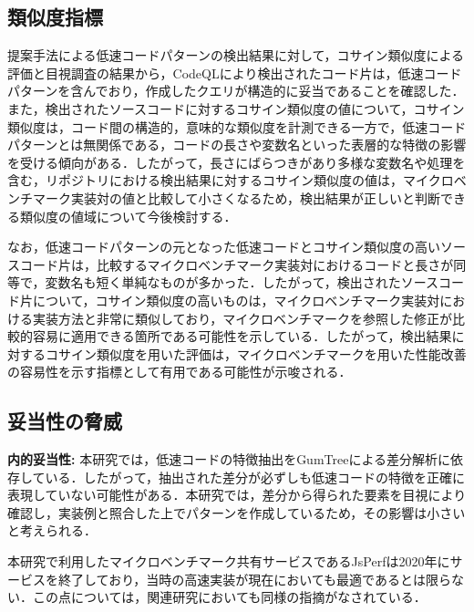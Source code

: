 \documentclass[submit,techrep,noauthor]{ipsj}
\begin{document}


\subsection{類似度指標}

提案手法による低速コードパターンの検出結果に対して，コサイン類似度による評価と目視調査の結果から，CodeQLにより検出されたコード片は，低速コードパターンを含んでおり，作成したクエリが構造的に妥当であることを確認した．
また，検出されたソースコードに対するコサイン類似度の値について，コサイン類似度は，コード間の構造的，意味的な類似度を計測できる一方で，低速コードパターンとは無関係である，コードの長さや変数名といった表層的な特徴の影響を受ける傾向がある．したがって，長さにばらつきがあり多様な変数名や処理を含む，リポジトリにおける検出結果に対するコサイン類似度の値は，マイクロベンチマーク実装対の値と比較して小さくなるため，検出結果が正しいと判断できる類似度の値域について今後検討する．

なお，低速コードパターンの元となった低速コードとコサイン類似度の高いソースコード片は，比較するマイクロベンチマーク実装対におけるコードと長さが同等で，変数名も短く単純なものが多かった．したがって，検出されたソースコード片について，コサイン類似度の高いものは，マイクロベンチマーク実装対における実装方法と非常に類似しており，マイクロベンチマークを参照した修正が比較的容易に適用できる箇所である可能性を示している．したがって，検出結果に対するコサイン類似度を用いた評価は，マイクロベンチマークを用いた性能改善の容易性を示す指標として有用である可能性が示唆される．


\subsection{妥当性の脅威}

\noindent\textbf{内的妥当性:}
本研究では，低速コードの特徴抽出をGumTreeによる差分解析に依存している．したがって，抽出された差分が必ずしも低速コードの特徴を正確に表現していない可能性がある．本研究では，差分から得られた要素を目視により確認し，実装例と照合した上でパターンを作成しているため，その影響は小さいと考えられる．

本研究で利用したマイクロベンチマーク共有サービスであるJsPerfは2020年にサービスを終了しており，当時の高速実装が現在においても最適であるとは限らない．この点については，関連研究\cite{omori}においても同様の指摘がなされている．
\end{document}
